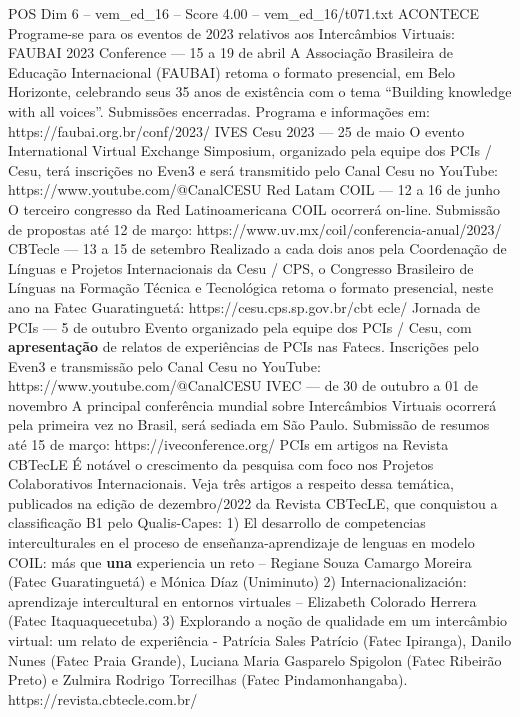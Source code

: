 \begin{textsample}{POS Dim 6 – vem\_ed\_16 – Score 4.00 – vem\_ed\_16/t071.txt}  \label{ex:f6_pos_144}
ACONTECE Programe-se para os eventos de 2023 relativos aos Intercâmbios Virtuais: FAUBAI 2023 Conference — 15 a 19 de abril A Associação Brasileira de Educação Internacional (FAUBAI) retoma o formato presencial, em Belo Horizonte, celebrando seus 35 anos de existência com o tema “Building knowledge with all voices”.
Submissões encerradas.
Programa e informações em: https://faubai.org.br/conf/2023/ IVES Cesu 2023 — 25 de maio O evento International Virtual Exchange Simposium, organizado pela equipe dos PCIs / Cesu, terá inscrições no Even3 e será transmitido pelo Canal Cesu no YouTube: https://www.youtube.com/@CanalCESU Red Latam COIL — 12 a 16 de junho O terceiro congresso da Red Latinoamericana COIL ocorrerá on-line.
Submissão de propostas até 12 de março: https://www.uv.mx/coil/conferencia-anual/2023/ CBTecle — 13 a 15 de setembro Realizado a cada dois anos pela Coordenação de Línguas e Projetos Internacionais da Cesu / CPS, o Congresso Brasileiro de Línguas na Formação Técnica e Tecnológica retoma o formato presencial, neste ano na Fatec Guaratinguetá: https://cesu.cps.sp.gov.br/cbt ecle/ Jornada de PCIs — 5 de outubro Evento organizado pela equipe dos PCIs / Cesu, com \textbf{apresentação} de relatos de experiências de PCIs nas Fatecs.
Inscrições pelo Even3 e transmissão pelo Canal Cesu no YouTube: https://www.youtube.com/@CanalCESU IVEC — de 30 de outubro a 01 de novembro A principal conferência mundial sobre Intercâmbios Virtuais ocorrerá pela primeira vez no Brasil, será sediada em São Paulo.
Submissão de resumos até 15 de março: https://iveconference.org/ PCIs em artigos na Revista CBTecLE É notável o crescimento da pesquisa com foco nos Projetos Colaborativos Internacionais.
Veja três artigos a respeito dessa temática, publicados na edição de dezembro/2022 da Revista CBTecLE, que conquistou a classificação B1 pelo Qualis-Capes: 1) El desarrollo de competencias interculturales en el proceso de enseñanza-aprendizaje de lenguas en modelo COIL: más que \textbf{una} experiencia un reto – Regiane Souza Camargo Moreira (Fatec Guaratinguetá) e Mónica Díaz (Uniminuto) 2) Internacionalización: aprendizaje intercultural en entornos virtuales – Elizabeth Colorado Herrera (Fatec Itaquaquecetuba) 3) Explorando a noção de qualidade em um intercâmbio virtual: um relato de experiência - Patrícia Sales Patrício (Fatec Ipiranga), Danilo Nunes (Fatec Praia Grande), Luciana Maria Gasparelo Spigolon (Fatec Ribeirão Preto) e Zulmira Rodrigo Torrecilhas (Fatec Pindamonhangaba). https://revista.cbtecle.com.br/

\end{textsample}
